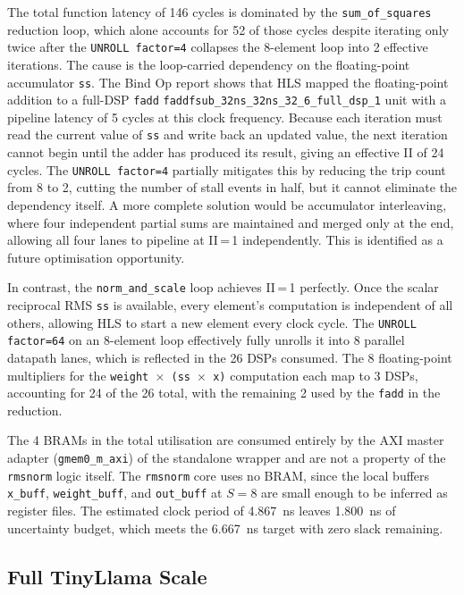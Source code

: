 The total function latency of 146 cycles is dominated by the
\texttt{sum\_of\_squares} reduction loop, which alone accounts for 52
of those cycles despite iterating only twice after the
\texttt{UNROLL factor=4} collapses the 8-element loop into 2 effective
iterations. The cause is the loop-carried dependency on the
floating-point accumulator \texttt{ss}. The Bind Op report shows that
HLS mapped the floating-point addition to a full-DSP \texttt{fadd}
\texttt{faddfsub\_32ns\_32ns\_32\_6\_full\_dsp\_1} unit
with a pipeline latency of 5 cycles at this clock frequency. Because each
iteration must read the current value of \texttt{ss} and write back an
updated value, the next iteration cannot begin until the adder has
produced its result, giving an effective II of 24 cycles. The
\texttt{UNROLL factor=4} partially mitigates this by reducing the trip
count from 8 to 2, cutting the number of stall events in half, but it
cannot eliminate the dependency itself. A more complete solution would be
accumulator interleaving, where four independent partial sums are
maintained and merged only at the end, allowing all four lanes to pipeline
at II\,=\,1 independently. This is identified as a future optimisation
opportunity.

In contrast, the \texttt{norm\_and\_scale} loop achieves II\,=\,1
perfectly. Once the scalar reciprocal RMS \texttt{ss} is available, every
element's computation is independent of all others, allowing HLS to start
a new element every clock cycle. The \texttt{UNROLL factor=64} on an
8-element loop effectively fully unrolls it into 8 parallel datapath
lanes, which is reflected in the 26 DSPs consumed. The 8 floating-point
multipliers for the \texttt{weight\,$\times$\,(ss\,$\times$\,x)}
computation each map to 3 DSPs, accounting for 24 of the 26 total, with
the remaining 2 used by the \texttt{fadd} in the reduction.

The 4 BRAMs in the total utilisation are consumed entirely by the AXI
master adapter (\texttt{gmem0\_m\_axi}) of the standalone wrapper and
are not a property of the \texttt{rmsnorm} logic itself. The
\texttt{rmsnorm} core uses no BRAM, since the local buffers
\texttt{x\_buff}, \texttt{weight\_buff}, and \texttt{out\_buff} at
$S = 8$ are small enough to be inferred as register files. The estimated
clock period of \SI{4.867}{\nano\second} leaves \SI{1.800}{\nano\second}
of uncertainty budget, which meets the \SI{6.667}{\nano\second}
target with zero slack remaining. 
\subsection{Full TinyLlama Scale}
\label{subsec:rmsnorm_update3}

